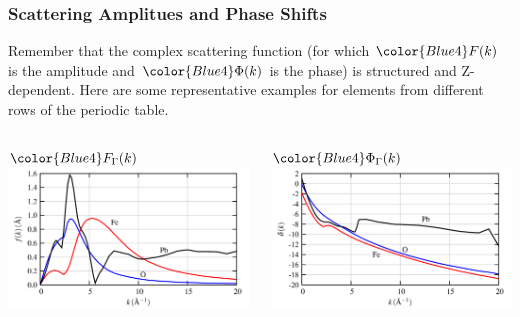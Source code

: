 \documentclass[10pt, xcolor=x11names, compress]{beamer}
\begin{document}
\begin{frame}
  \frametitle{Scattering Amplitues and Phase Shifts}
  \small
  
  Remember that the complex scattering function (for which
  $\color{Blue4}F(k)$ is the amplitude and 
  ${\color{Blue4}\Phi(k)}$ is the phase) is structured and
  Z-dependent.  Here are some representative examples for elements
  from different rows of the periodic table.
  
  \begin{columns}[T]
    \begin{column}{0.5\linewidth}
      \centering $\color{Blue4}F_\Gamma(k)$\\
      \includegraphics[width=\linewidth]{amplitudes.png}      
    \end{column}
    \begin{column}{0.5\linewidth}
      \centering ${\color{Blue4}\Phi_\Gamma(k)}$ \\
      \includegraphics[width=\linewidth]{phases.png}
    \end{column}
  \end{columns}


\end{frame}
\end{document}
